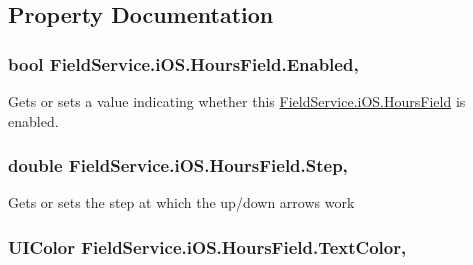 \subsection{Property Documentation}
\hypertarget{class_field_service_1_1i_o_s_1_1_hours_field_a4a5f0dbd5b98c259770858e31d4c7a78}{
\subsubsection[{Enabled}]{\setlength{\rightskip}{0pt plus 5cm}bool Field\+Service.\+i\+O\+S.\+Hours\+Field.\+Enabled\hspace{0.3cm}{\ttfamily [get]}, {\ttfamily [set]}}}\label{class_field_service_1_1i_o_s_1_1_hours_field_a4a5f0dbd5b98c259770858e31d4c7a78}


Gets or sets a value indicating whether this \hyperlink{class_field_service_1_1i_o_s_1_1_hours_field}{Field\+Service.\+i\+O\+S.\+Hours\+Field} is enabled. 

\hypertarget{class_field_service_1_1i_o_s_1_1_hours_field_a18e5c93c4287d0a5653c391b92c540b1}{
\subsubsection[{Step}]{\setlength{\rightskip}{0pt plus 5cm}double Field\+Service.\+i\+O\+S.\+Hours\+Field.\+Step\hspace{0.3cm}{\ttfamily [get]}, {\ttfamily [set]}}}\label{class_field_service_1_1i_o_s_1_1_hours_field_a18e5c93c4287d0a5653c391b92c540b1}


Gets or sets the step at which the up/down arrows work 

\hypertarget{class_field_service_1_1i_o_s_1_1_hours_field_a6e425d3081b5e375bba019332a4516bb}{
\subsubsection[{Text\+Color}]{\setlength{\rightskip}{0pt plus 5cm}U\+I\+Color Field\+Service.\+i\+O\+S.\+Hours\+Field.\+Text\+Color\hspace{0.3cm}{\ttfamily [get]}, {\ttfamily [set]}}}\label{class_field_service_1_1i_o_s_1_1_hours_field_a6e425d3081b5e375bba019332a4516bb}


